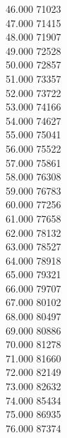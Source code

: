 { 46.000	71023 \\
 47.000	71415 \\
 48.000	71907 \\
 49.000	72528 \\
 50.000	72857 \\
 51.000	73357 \\
 52.000	73722 \\
 53.000	74166 \\
 54.000	74627 \\
 55.000	75041 \\
 56.000	75522 \\
 57.000	75861 \\
 58.000	76308 \\
 59.000	76783 \\
 60.000	77256 \\
 61.000	77658 \\
 62.000	78132 \\
 63.000	78527 \\
 64.000	78918 \\
 65.000	79321 \\
 66.000	79707 \\
 67.000	80102 \\
 68.000	80497 \\
 69.000	80886 \\
 70.000	81278 \\
 71.000	81660 \\
 72.000	82149 \\
 73.000	82632 \\
 74.000	85434 \\
 75.000	86935 \\
 76.000	87374 \\
}
